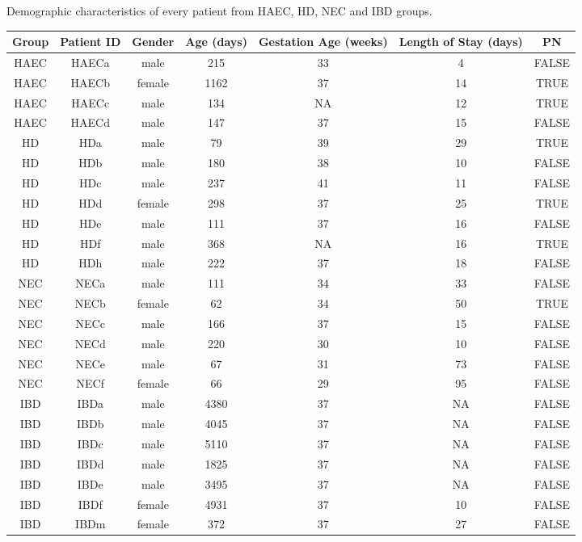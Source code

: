 \begin{sidewaystable}[h]
  \tiny
{}
  {Demographic characteristics of every patient from HAEC, HD, NEC and IBD groups.}%
\centering %
\begin{tabular}{ccccccc} %
\hline\hline %
Group & Patient ID & Gender & Age (days) & Gestation Age (weeks) & Length of Stay (days) & PN \\ %
\hline %
HAEC & HAECa & male & 215 & 33 & 4 & FALSE \\
HAEC & HAECb & female & 1162 & 37 & 14 & TRUE \\
HAEC & HAECc & male & 134 & NA & 12 & TRUE \\
HAEC & HAECd & male & 147 & 37 & 15 & FALSE \\
HD & HDa & male & 79 & 39 & 29 & TRUE \\
HD & HDb & male & 180 & 38 & 10 & FALSE \\
HD & HDc & male & 237 & 41 & 11 & FALSE \\
HD & HDd & female & 298 & 37 & 25 & TRUE \\
HD & HDe & male & 111 & 37 & 16 & FALSE \\
HD & HDf & male & 368 & NA & 16 & TRUE \\
HD & HDh & male & 222 & 37 & 18 & FALSE \\
NEC & NECa & male & 111 & 34 & 33 & FALSE \\
NEC & NECb & female & 62 & 34 & 50 & TRUE \\
NEC & NECc & male & 166 & 37 & 15 & FALSE \\
NEC & NECd & male & 220 & 30 & 10 & FALSE \\
NEC & NECe & male & 67 & 31 & 73 & FALSE \\
NEC & NECf & female & 66 & 29 & 95 & FALSE \\
IBD & IBDa & male & 4380 & 37 & NA & FALSE \\
IBD & IBDb & male & 4045 & 37 & NA & FALSE \\
IBD & IBDc & male & 5110 & 37 & NA & FALSE \\
IBD & IBDd & male & 1825 & 37 & NA & FALSE \\
IBD & IBDe & male & 3495 & 37 & NA & FALSE \\
IBD & IBDf & female & 4931 & 37 & 10 & FALSE \\
IBD & IBDm & female & 372 & 37 & 27 & FALSE \\
\hline %
\end{tabular}
\label{tab:3demograph}
\end{sidewaystable}
